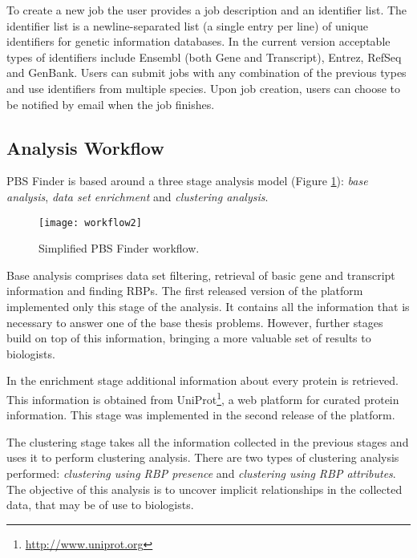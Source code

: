 To create a new job the user provides a job description and an identifier list.
The identifier list is a newline-separated list (a single entry per line) of
unique identifiers for genetic information databases. In the current version
acceptable types of identifiers include Ensembl (both Gene and Transcript),
Entrez, RefSeq and GenBank. Users can submit jobs with any combination of the
previous types and use identifiers from multiple species. Upon job creation,
users can choose to be notified by email when the job finishes.

\subsection{Analysis Workflow}\label{sec:pbsworkflow}

PBS Finder is based around a three stage analysis model (Figure
\ref{fig:workflow2}): \emph{base analysis}, \emph{data set enrichment} and
\emph{clustering analysis}.

\begin{figure}[!htb]
  \begin{center}
    \leavevmode
    \texttt{[image: workflow2]}
    \caption[Simplified PBS Finder workflow]{
      Simplified PBS Finder workflow.
    }
    \label{fig:workflow2}
  \end{center}
\end{figure}

Base analysis comprises data set filtering, retrieval of basic gene and
transcript information and finding RBPs. The first released version of the
platform implemented only this stage of the analysis. It contains all the
information that is necessary to answer one of the base thesis problems.
However, further stages build on top of this information, bringing a more
valuable set of results to biologists.

In the enrichment stage additional information about every protein is retrieved.
This information is obtained from
UniProt\footnote{\url{http://www.uniprot.org}}, a web platform for curated
protein information. This stage was implemented in the second release of the
platform.

The clustering stage takes all the information collected in the previous stages
and uses it to perform clustering analysis. There are two types of clustering
analysis performed: \emph{clustering using RBP presence} and \emph{clustering
using RBP attributes}. The objective of this analysis is to uncover implicit
relationships in the collected data, that may be of use to biologists.

